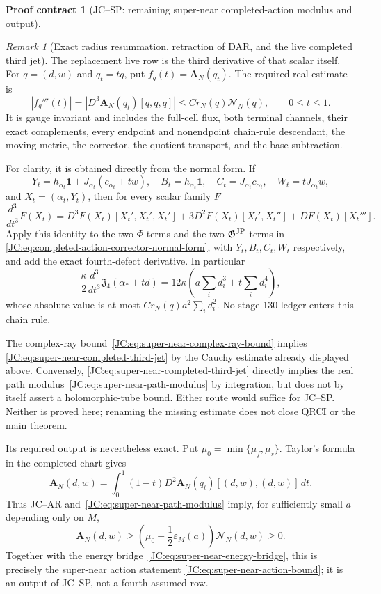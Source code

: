 \documentclass[11pt]{amsart}
\numberwithin{equation}{section}
\theoremstyle{definition}
\newtheorem{contract}[theorem]{Proof contract}
\theoremstyle{remark}
\newtheorem{remark}[theorem]{Remark}
\newcommand{\Jfour}{\mathfrak J_4}
\newcommand{\Gjp}{\mathfrak G^{\rm JP}}
\begin{document}
\begin{contract}[JC--SP: remaining super-near completed-action modulus and output]
\begin{remark}[Exact radius resummation, retraction of DAR, and the live completed third jet]
The replacement live row is the third derivative of that scalar itself.
For $q=(d,w)$ and $q_t=tq$, put
$f_q(t)=\mathbf A_N(q_t)$.  The required real estimate is
\begin{equation}\label{JC:eq:super-near-completed-third-jet}
 \boxed{
 |f_q'''(t)|
 =|D^3\mathbf A_N(q_t)[q,q,q]|
 \le C r_N(q)\mathcal N_N(q),\qquad0\le t\le1.}
\end{equation}
It is gauge invariant and includes the full-cell flux, both terminal
channels, their exact complements, every endpoint and nonendpoint
chain-rule descendant, the moving metric, the corrector, the quotient
transport, and the base subtraction.

For clarity, it is obtained directly from the normal form.  If
\[
 Y_t=h_{\alpha_t}\mathbf1+J_{\alpha_t}(c_{\alpha_t}+tw),\quad
 B_t=h_{\alpha_t}\mathbf1,\quad
 C_t=J_{\alpha_t}c_{\alpha_t},\quad
 W_t=tJ_{\alpha_t}w,
\]
and $X_t=(\alpha_t,Y_t)$, then for every scalar family $F$
\[
 \frac{d^3}{dt^3}F(X_t)
 =D^3F(X_t)[X_t',X_t',X_t']
  +3D^2F(X_t)[X_t',X_t'']+DF(X_t)[X_t'''].
\]
Apply this identity to the two $\Phi$ terms and the two $\Gjp$ terms in
\eqref{JC:eq:completed-action-corrector-normal-form}, with $Y_t,B_t,C_t,W_t$
respectively, and add the exact fourth-defect derivative.  In particular
\[
 \frac\kappa2\frac{d^3}{dt^3}\Jfour(\alpha_*+td)
 =12\kappa\left(a\sum_i d_i^3+t\sum_i d_i^4\right),
\]
whose absolute value is at most
$Cr_N(q)a^2\sum_i d_i^2$.  No stage-130 ledger enters this chain rule.

The complex-ray bound~\eqref{JC:eq:super-near-complex-ray-bound} implies
\eqref{JC:eq:super-near-completed-third-jet} by the Cauchy estimate already
displayed above.  Conversely,
\eqref{JC:eq:super-near-completed-third-jet} directly implies the real path
modulus~\eqref{JC:eq:super-near-path-modulus} by integration, but does not by
itself assert a holomorphic-tube bound.  Either route would suffice for
JC--SP.  Neither is proved here; renaming the missing estimate does not
close QRCI or the main theorem.
\end{remark}

Its required output is nevertheless exact.  Put
$\mu_0=\min\{\mu_f,\mu_s\}$.  Taylor's formula in the completed chart gives
\[
 \mathbf A_N(d,w)=
 \int_0^1(1-t)D^2\mathbf A_N(q_t)[(d,w),(d,w)]\,dt.
\]
Thus JC--AR and~\eqref{JC:eq:super-near-path-modulus} imply, for sufficiently
small $a$ depending only on $M$,
\begin{equation}\label{JC:eq:JC-SP-output}
 \boxed{
 \mathbf A_N(d,w)\ge
 \left(\mu_0-\frac12\varepsilon_M(a)\right)\mathcal N_N(d,w)
 \ge0.}
\end{equation}
Together with the energy bridge~\eqref{JC:eq:super-near-energy-bridge}, this
is precisely the super-near action statement
\eqref{JC:eq:super-near-action-bound}; it is an output of JC--SP, not a
fourth assumed row.
\end{contract}
\end{document}
